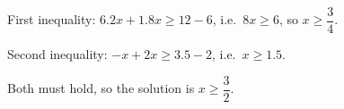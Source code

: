 First inequality: $6.2x+1.8x\ge12-6$, i.e.\ $8x\ge6$, so $x\ge\dfrac{3}{4}$.

Second inequality: $-x+2x\ge3.5-2$, i.e.\ $x\ge1.5$.

Both must hold, so the solution is $\boxed{x\ge\dfrac{3}{2}}$.
